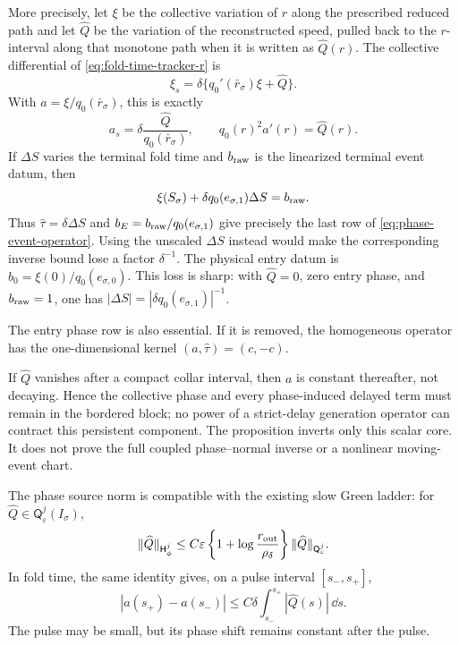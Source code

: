 \begin{proposition}
More precisely, let \(\xi\) be the collective variation of \(r\) along
the prescribed reduced path and let \(\widehat Q\) be the variation of the
reconstructed speed, pulled back to the \(r\)-interval along that monotone
path when it is written as \(\widehat Q(r)\).  The collective differential of
\cref{eq:fold-time-tracker-r} is
\begin{equation}
 \xi_s=\delta\{q_0'(\bar r_\sigma)\xi+\widehat Q\}.
                                                               \label{eq:phase-event-xi-equation}
\end{equation}
With \(a=\xi/q_0(\bar r_\sigma)\), this is exactly
\begin{equation}
 a_s=\delta\frac{\widehat Q}{q_0(\bar r_\sigma)},
 \qquad q_0(r)^2a'(r)=\widehat Q(r).              \label{eq:phase-event-a-equation}
\end{equation}
If \(\Delta S\) varies the terminal fold time and \(b_{\rm raw}\) is the
linearized terminal event datum, then
\begin{equation}
 \xi(S_\sigma)+\delta q_0(e_{\sigma,1})\Delta S
 =b_{\rm raw}.                                   \label{eq:phase-event-raw-row}
\end{equation}
Thus \(\widehat\tau=\delta\Delta S\) and
\(b_E=b_{\rm raw}/q_0(e_{\sigma,1})\) give precisely the last row of
\cref{eq:phase-event-operator}.  Using the unscaled \(\Delta S\) instead
would make the corresponding inverse bound lose a factor \(\delta^{-1}\).
The physical entry datum is
\(b_0=\xi(0)/q_0(e_{\sigma,0})\).
This loss is sharp: with \(\widehat Q=0\), zero entry phase, and
\(b_{\rm raw}=1\), one has
\(|\Delta S|=|\delta q_0(e_{\sigma,1})|^{-1}\).

The entry phase row is also essential.  If it is removed, the homogeneous
operator has the one-dimensional kernel
\((a,\widehat\tau)=(c,-c)\).

If \(\widehat Q\) vanishes after a compact collar interval, then \(a\) is
constant thereafter, not decaying.  Hence the collective phase and every
phase-induced delayed term must remain in the bordered block; no power of a
strict-delay generation operator can contract this persistent component.
The proposition inverts only this scalar core.  It does not prove the full
coupled phase--normal inverse or a nonlinear moving-event chart.

The phase source norm is compatible with the existing slow Green ladder:
for \(\widehat Q\in\mathsf Q_\varepsilon^j(I_\sigma)\),
\begin{equation}
 \|\widehat Q\|_{\mathsf H_\phi^j}
 \le C\varepsilon
   \left\{1+\log\frac{r_{\rm out}}{\rho_\delta}\right\}
   \|\widehat Q\|_{\mathsf Q_\varepsilon^j}.      \label{eq:phase-event-Q-embedding}
\end{equation}
In fold time, the same identity gives, on a pulse interval \([s_-,s_+]\),
\begin{equation}
 |a(s_+)-a(s_-)|
 \le C\delta\int_{s_-}^{s_+}|\widehat Q(s)|\,\dd s.            \label{eq:phase-event-pulse-bound}
\end{equation}
The pulse may be small, but its phase shift remains constant after the pulse.
\end{proposition}

